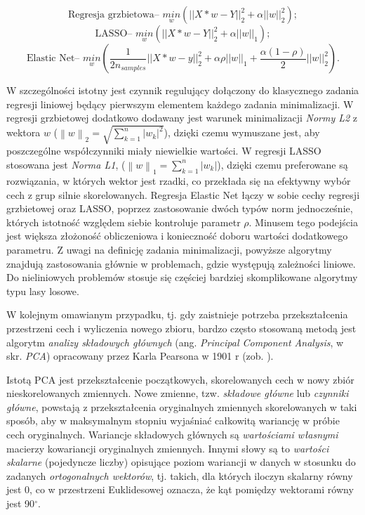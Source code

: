 \begin{equation}
\textrm{Regresja grzbietowa-- } \underset{w}{min} (||X*w-Y||_2^2 + \alpha ||w||_2^2);
\label{equ:ridgeReg}
\end{equation}
\begin{equation}
\textrm{LASSO-- } \underset{w}{min} (||X*w-Y||_2^2 + \alpha ||w||_1);
\label{equ:lassoReg}
\end{equation}
\begin{equation}
\textrm{Elastic Net-- } \underset{w}{min} ({ \frac{1}{2n_{samples}} ||X*w - y||_2 ^ 2 + \alpha \rho ||w||_1 + \frac{\alpha(1-\rho)}{2} ||w||_2 ^ 2}).
\label{equ:elasticNet}
\end{equation}

W szczególności istotny jest czynnik regulujący dołączony do klasycznego zadania regresji liniowej będący pierwszym elementem każdego zadania minimalizacji. W regresji grzbietowej dodatkowo dodawany jest warunek minimalizacji \textit{Normy L2} z wektora $w$ ($\left \| w \right \|_2 =\sqrt{ \sum_{k=1}^{n}\left |w_k  \right |^2}$), dzięki czemu wymuszane jest, aby poszczególne współczynniki miały niewielkie wartości. W regresji LASSO stosowana jest \textit{Norma L1}, ($\left \| w \right \|_1 = \sum_{k=1}^{n}\left |w_k  \right |$), dzięki czemu preferowane są rozwiązania, w których wektor jest rzadki, co przekłada się na efektywny wybór cech z grup silnie skorelowanych. Regresja Elastic Net łączy w sobie cechy regresji grzbietowej oraz LASSO, poprzez zastosowanie dwóch typów norm jednocześnie, których istotność względem siebie kontroluje parametr $\rho$. Minusem tego podejścia jest większa złożoność obliczeniowa i konieczność doboru wartości dodatkowego parametru. Z uwagi na definicję zadania minimalizacji, powyższe algorytmy znajdują zastosowania głównie w problemach, gdzie występują zależności liniowe. Do nieliniowych problemów stosuje się częściej bardziej skomplikowane algorytmy typu lasy losowe.

W kolejnym omawianym przypadku, tj. gdy zaistnieje potrzeba przekształcenia przestrzeni cech i wyliczenia nowego zbioru, bardzo często stosowaną metodą jest algorytm \textit{analizy składowych głównych} (ang. \textit{Principal Component Analysis}, w skr. \textit{PCA}) opracowany przez Karla Pearsona w 1901 r (zob. \cite{PCA}).  

Istotą PCA jest przekształcenie początkowych, skorelowanych cech w nowy zbiór nieskorelowanych zmiennych. Nowe zmienne, tzw. \textit{składowe główne} lub \textit{czynniki główne}, powstają z przekształcenia oryginalnych zmiennych skorelowanych w taki sposób, aby w maksymalnym stopniu wyjaśniać całkowitą wariancję w próbie cech oryginalnych. Wariancje składowych głównych są \textit{wartościami własnymi} macierzy kowariancji oryginalnych zmiennych. Innymi słowy są to \textit{wartości skalarne} (pojedyncze liczby) opisujące poziom wariancji w danych w stosunku do zadanych \textit{ortogonalnych wektorów}, tj. takich, dla których iloczyn skalarny równy jest 0, co \linebreak w przestrzeni Euklidesowej oznacza, że kąt pomiędzy wektorami równy jest 90$^\circ$.

